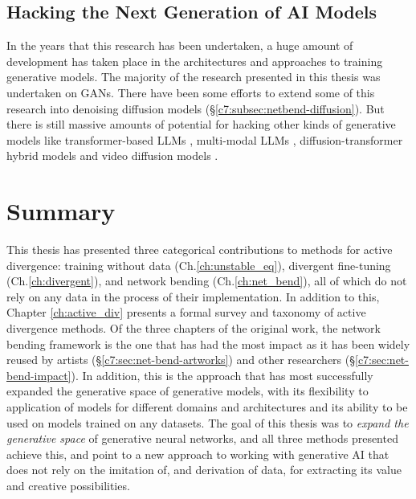 \subsection{Hacking the Next Generation of AI Models}

In the years that this research has been undertaken, a huge amount of development has taken place in the architectures and approaches to training generative models.
The majority of the research presented in this thesis was undertaken on GANs.
There have been some efforts to extend some of this research into denoising diffusion models \citep{dzwonczyk2024network} (\S \ref{c7:subsec:netbend-diffusion}). 
But there is still massive amounts of potential for hacking other kinds of generative models like transformer-based LLMs \citep{vaswani2017attention}, multi-modal LLMs \citep{zhang2024mm}, diffusion-transformer hybrid models \citep{peebles2023scalable} and video diffusion models \citep{ho2022video}.

\section{Summary}

This thesis has presented three categorical contributions to methods for active divergence: training without data (Ch.\ref{ch:unstable_eq}), divergent fine-tuning  (Ch.\ref{ch:divergent}), and network bending  (Ch.\ref{ch:net_bend}), all of which do not rely on any data in the process of their implementation. 
In addition to this, Chapter \ref{ch:active_div} presents a formal survey and taxonomy of active divergence methods.
Of the three chapters of the original work, the network bending framework is the one that has had the most impact as it has been widely reused by artists  (\S \ref{c7:sec:net-bend-artworks}) and other researchers  (\S \ref{c7:sec:net-bend-impact}). 
In addition, this is the approach that has most successfully expanded the generative space of generative models, with its flexibility to application of models for different domains and architectures and its ability to be used on models trained on any datasets.
The goal of this thesis was to \textit{expand the generative space} of generative neural networks, and all three methods presented achieve this, and point to a new approach to working with generative AI that does not rely on the imitation of, and derivation of data, for extracting its value and creative possibilities.
